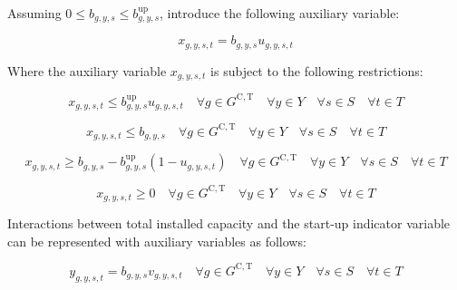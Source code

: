 \documentclass{article}
\newcommand{\sGeneratorsCandidateThermal}{G^{\mathrm{C,T}}}
\newcommand{\sYears}{Y}
\newcommand{\sScenarios}{S}
\newcommand{\sIntervals}{T}
\newcommand{\iGenerator}{g}
\newcommand{\iYear}{y}
\newcommand{\iScenario}{s}
\newcommand{\iInterval}{t}
\newcommand{\vStartupIndicator}[1][\iGenerator,\iYear,\iScenario,\iInterval]{v_{#1}}
\newcommand{\vOnIndicator}[1][\iGenerator,\iYear,\iScenario,\iInterval]{u_{#1}}
\newcommand{\vInstalledCapacityTotalScenario}[1][\iGenerator,\iYear,\iScenario]{b_{#1}}
\newcommand{\vInstalledCapacityOnStateAux}[1][\iGenerator,\iYear,\iScenario,\iInterval]{x_{#1}}
\newcommand{\vInstalledCapacityStartupStateAux}[1][\iGenerator,\iYear,\iScenario,\iInterval]{y_{#1}}
\begin{document}
Assuming $0 \leq \vInstalledCapacityTotalScenario \leq \vInstalledCapacityTotalScenario^{\mathrm{up}}$, introduce the following auxiliary variable:

\begin{equation}
\vInstalledCapacityOnStateAux = \vInstalledCapacityTotalScenario \vOnIndicator
\end{equation}

Where the auxiliary variable $\vInstalledCapacityOnStateAux$ is subject to the following restrictions:

\begin{equation}
\vInstalledCapacityOnStateAux \leq \vInstalledCapacityTotalScenario^{\mathrm{up}} \vOnIndicator \quad \forall \iGenerator \in \sGeneratorsCandidateThermal \quad \forall \iYear \in \sYears \quad \forall \iScenario \in \sScenarios \quad \forall \iInterval \in \sIntervals
\label{eqn: on state aux variable block start}
\end{equation}

\begin{equation}
\vInstalledCapacityOnStateAux \leq \vInstalledCapacityTotalScenario \quad \forall \iGenerator \in \sGeneratorsCandidateThermal \quad \forall \iYear \in \sYears \quad \forall \iScenario \in \sScenarios \quad \forall \iInterval \in \sIntervals
\end{equation}

\begin{equation}
\vInstalledCapacityOnStateAux \geq \vInstalledCapacityTotalScenario - \vInstalledCapacityTotalScenario^{\mathrm{up}} \left(1 - \vOnIndicator \right) \quad \forall \iGenerator \in \sGeneratorsCandidateThermal \quad \forall \iYear \in \sYears \quad \forall \iScenario \in \sScenarios \quad \forall \iInterval \in \sIntervals
\end{equation}

\begin{equation}
\vInstalledCapacityOnStateAux \geq 0 \quad \forall \iGenerator \in \sGeneratorsCandidateThermal \quad \forall \iYear \in \sYears \quad \forall \iScenario \in \sScenarios \quad \forall \iInterval \in \sIntervals
\label{eqn: on state aux variable block end}
\end{equation}

Interactions between total installed capacity and the start-up indicator variable can be represented with auxiliary variables as follows:

\begin{equation}
\vInstalledCapacityStartupStateAux = \vInstalledCapacityTotalScenario \vStartupIndicator \quad \forall \iGenerator \in \sGeneratorsCandidateThermal \quad \forall \iYear \in \sYears \quad \forall \iScenario \in \sScenarios \quad \forall \iInterval \in \sIntervals
\end{equation}
\end{document}

